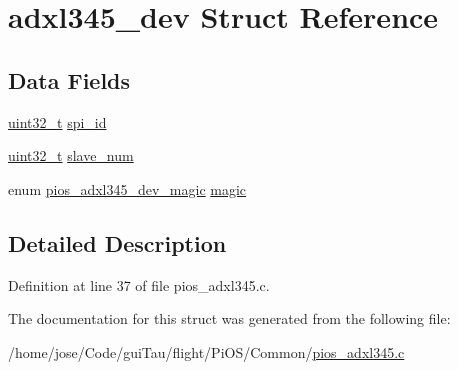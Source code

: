 \hypertarget{structadxl345__dev}{\section{adxl345\-\_\-dev Struct Reference}
\label{structadxl345__dev}
}
\subsection*{Data Fields}
\begin{DoxyCompactItemize}
\item 
\hyperlink{stdint_8h_a435d1572bf3f880d55459d9805097f62}{uint32\-\_\-t} \hyperlink{group___p_i_o_s___a_d_x_l345_ga2681cf2ea08ddf51ce6cea962e6ea9a7}{spi\-\_\-id}
\item 
\hyperlink{stdint_8h_a435d1572bf3f880d55459d9805097f62}{uint32\-\_\-t} \hyperlink{group___p_i_o_s___a_d_x_l345_ga0955d4176a279516aa3b7dcbea03965c}{slave\-\_\-num}
\item 
enum \hyperlink{group___p_i_o_s___a_d_x_l345_ga2f1fd1a4af16c722d816221da8924b5c}{pios\-\_\-adxl345\-\_\-dev\-\_\-magic} \hyperlink{group___p_i_o_s___a_d_x_l345_ga71c28fb64e7d683548f06eb171dc5cde}{magic}
\end{DoxyCompactItemize}


\subsection{Detailed Description}


Definition at line 37 of file pios\-\_\-adxl345.\-c.



The documentation for this struct was generated from the following file\-:\begin{DoxyCompactItemize}
\item 
/home/jose/\-Code/gui\-Tau/flight/\-Pi\-O\-S/\-Common/\hyperlink{pios__adxl345_8c}{pios\-\_\-adxl345.\-c}\end{DoxyCompactItemize}
